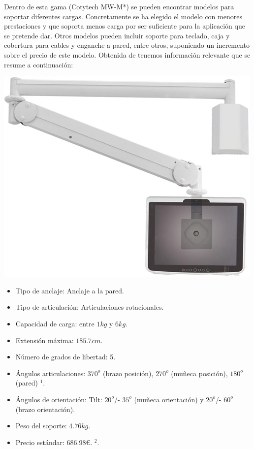 Dentro de esta gama (Cotytech MW-M*) se pueden encontrar modelos para soportar diferentes cargas. Concretamente se ha elegido el modelo con menores prestaciones y que soporta menos carga por ser suficiente para la aplicación que se pretende dar. Otros modelos pueden incluir soporte para teclado, caja y cobertura para cables y enganche a pared, entre otros, suponiendo un incremento sobre el precio de este modelo. Obtenida de \cite{CotytechMWM13P:2018} tenemos información relevante que se resume a continuación:

\begin{minipage}{0.35\textwidth}
	\includegraphics[width=\linewidth]{figuras/Imagenes_EstadoArte/Cotytech_MW-M13P.jpg}
\end{minipage}
\begin{minipage}{0.65\textwidth}\raggedright
	\hspace{1cm}
	\begin{itemize}
		\item Tipo de anclaje: Anclaje a la pared.
		\item Tipo de articulación: Articulaciones rotacionales.
		\item Capacidad de carga: entre $1kg$ y $6kg$.
		\item Extensión máxima: $185.7cm$.
		\item Número de grados de libertad: 5.
		\item Ángulos articulaciones: $370^o$ (brazo posición), $270^o$ (muñeca posición), $180^o$ (pared) $^1$. %
		\item Ángulos de orientación: Tilt: $20^o$/- $35^o$ (muñeca orientación) y $20^o$/- $60^o$ (brazo orientación).
		\item Peso del soporte: $4.76 kg$.
		\item Precio estándar: 686.98\euro. $^2$. %
	\end{itemize}
\end{minipage}

